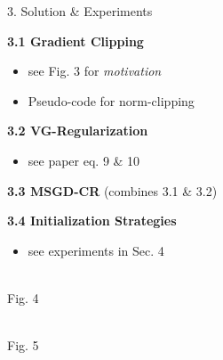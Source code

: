 \documentclass[final]{beamer}
\begin{document}
\begin{frame}[t]
\begin{columns}[t,totalwidth=\textwidth]

\begin{column}{0.33\textwidth}
    \begin{block}{3. Solution \& Experiments}
  
      \textbf{3.1 Gradient Clipping}
      \begin{itemize}
        \item see Fig. 3 for \textit{motivation}
        \item Pseudo-code for norm-clipping
      \end{itemize}
  
      \vspace{0.5em}
      \textbf{3.2 VG-Regularization}
      \begin{itemize}
        \item see paper eq. 9 \& 10
      \end{itemize}
  
      \vspace{0.5em}
      \textbf{3.3 MSGD-CR} \hfill {\footnotesize (combines 3.1 \& 3.2)}
  
      \vspace{0.5em}
      \textbf{3.4 Initialization Strategies}
      \begin{itemize}
        \item see experiments in Sec. 4
      \end{itemize}
  
      \vspace{1em}
      \begin{center}
        \\[0.3em]
        Fig. 4
      \end{center}

      \begin{center}
        \\[0.3em]
        Fig. 5
      \end{center}
  

\end{block}
\end{column}
\end{columns}
\end{frame}
\end{document}
